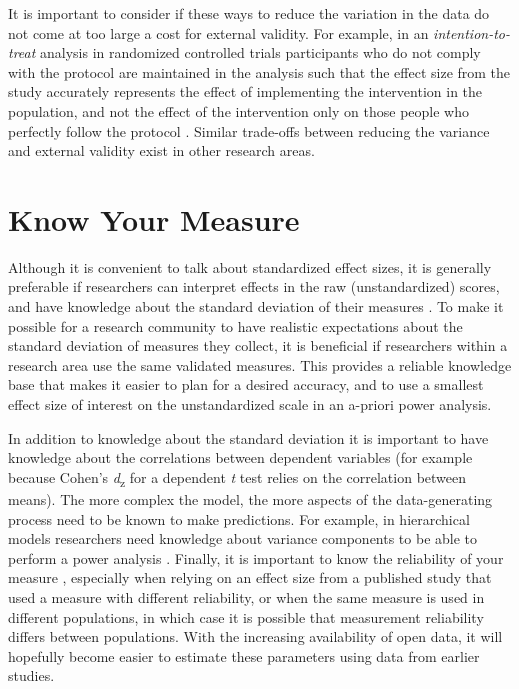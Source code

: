 \documentclass[
  oneside]{book}
\begin{document}
It is important to consider if these ways to reduce the variation in the data do not come at too large a cost for external validity. For example, in an \emph{intention-to-treat} analysis in randomized controlled trials participants who do not comply with the protocol are maintained in the analysis such that the effect size from the study accurately represents the effect of implementing the intervention in the population, and not the effect of the intervention only on those people who perfectly follow the protocol \citep{gupta_intention_2011}. Similar trade-offs between reducing the variance and external validity exist in other research areas.

\hypertarget{know-your-measure}{%
\section{Know Your Measure}\label{know-your-measure}}

Although it is convenient to talk about standardized effect sizes, it is generally preferable if researchers can interpret effects in the raw (unstandardized) scores, and have knowledge about the standard deviation of their measures \citep{baguley_standardized_2009, lenth_practical_2001}. To make it possible for a research community to have realistic expectations about the standard deviation of measures they collect, it is beneficial if researchers within a research area use the same validated measures. This provides a reliable knowledge base that makes it easier to plan for a desired accuracy, and to use a smallest effect size of interest on the unstandardized scale in an a-priori power analysis.

In addition to knowledge about the standard deviation it is important to have knowledge about the correlations between dependent variables (for example because Cohen's \emph{d}\textsubscript{z} for a dependent \emph{t} test relies on the correlation between means). The more complex the model, the more aspects of the data-generating process need to be known to make predictions. For example, in hierarchical models researchers need knowledge about variance components to be able to perform a power analysis \citep{westfall_statistical_2014, debruine_understanding_2021}. Finally, it is important to know the reliability of your measure \citep{parsons_psychological_2019}, especially when relying on an effect size from a published study that used a measure with different reliability, or when the same measure is used in different populations, in which case it is possible that measurement reliability differs between populations. With the increasing availability of open data, it will hopefully become easier to estimate these parameters using data from earlier studies.
\end{document}
